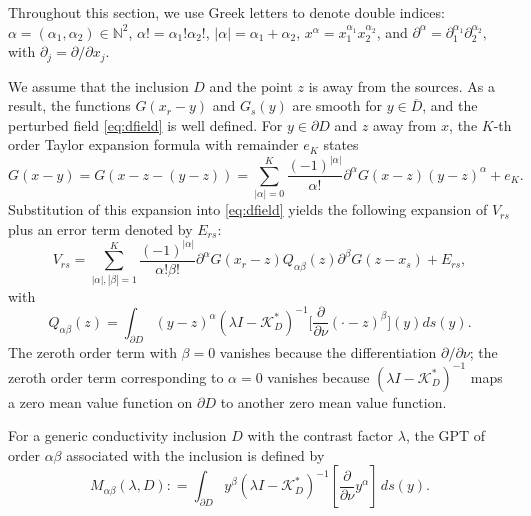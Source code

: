 Throughout this section, we use Greek letters to denote double
indices: $\alpha = (\alpha_1, \alpha_2) \in \mathbb{N}^2$,
$\alpha! = \alpha_1 ! \alpha_2 !$, $|\alpha| = \alpha_1 +
\alpha_2$, $x^\alpha = x_1^{\alpha_1} x_2^{\alpha_2}$,
and $\partial^\alpha = \partial_1^{\alpha_1}
\partial_2^{\alpha_2},$ with $\partial_j = \partial /
\partial x_j$.

We assume that the inclusion $D$ and the point $z$ is away from
the sources. As a result, the functions $G(x_r - y)$ and
$G_s(y)$ are smooth for $y \in \overline{D}$, and the
perturbed field \eqref{eq:dfield} is well defined. For $y \in
\partial D$ and $z$ away from $x$, the $K$-th order Taylor
expansion formula with remainder $e_K$ states
\begin{equation}
G(x - y) = G(x - z - (y-z)) = \sum_{|\alpha| = 0}^K
\frac{(-1)^{|\alpha|}}{\alpha!} \partial^{\alpha} G(x - z)
(y-z)^\alpha + e_K.
\end{equation}
Substitution of this expansion into \eqref{eq:dfield}
yields the following expansion of $V_{rs}$ plus an error term
denoted by $E_{rs}$:
\begin{equation*}
V_{rs}= \sum_{|\alpha|,|\beta|=1}^K \frac{(-1)^{|\alpha|}}{\alpha
! \beta !} \partial^\alpha G(x_r-z) Q_{\alpha\beta}(z)
\partial^\beta G(z-x_s) + E_{rs},
\end{equation*}
with
$$
Q_{\alpha\beta}(z)= \int_{\partial D} (y-z)^\alpha (\lambda I -
\mathcal{K}_D^*)^{-1} \bigg[\frac{\partial}{\partial \nu} (\cdot
-z)^\beta\bigg](y) ds(y).
$$
The zeroth order term with $\beta = 0$ vanishes because the
differentiation $\partial/\partial \nu$; the zeroth order term
corresponding to $\alpha = 0$ vanishes because $(\lambda I -
\mathcal{K}^*_D)^{-1}$ maps a zero mean value function on
$\partial D$ to another zero mean value function.

For a generic conductivity inclusion $D$ with the contrast factor
$\lambda$, the GPT of order $\alpha\beta$ associated with the
inclusion is defined by~\cite{ammari2007polarization}
\begin{equation}
M_{\alpha \beta}(\lambda, D) : = \int_{\partial D} y^\beta
(\lambda I - \mathcal{K}_{D}^*)^{-1}[\frac{\partial}{\partial \nu}
y^\alpha] \, ds(y). \label{eq:Mdef}
\end{equation}

